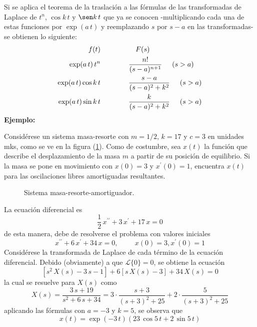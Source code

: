 Si se aplica el teorema de la traslación a las fórmulas de las transformadas de Laplace de $t^{n}$, $\cos k \, t$ y $\sen k \, t$ que ya se conocen  -multiplicando cada una de estas funciones por $\exp(a \, t)$ y reemplazando $s$ por $s - a$ en las transformadas- se obtienen lo siguiente:
\begin{align}
f(t) & \quad \quad \quad \quad \quad F(s) \nonumber \\
\exp(a \, t) \, t^{n} & \quad \quad \quad \quad \dfrac{n!}{(s-a)^{n+1}} \hspace{0.5cm} (s > a)  \label{eq:ecuacion_07_03_06} \\
\exp(a \, t) \cos k \, t & \quad \quad \quad \quad \dfrac{s-a}{(s-a)^{2}+ k^{2}} \hspace{0.5cm} (s > a)  \label{eq:ecuacion_07_03_07}\\
\exp(a \, t) \sin k \, t & \quad \quad \quad \quad \dfrac{k}{(s-a)^{2} + k^{2}} \hspace{0.5cm} (s > a)  \label{eq:ecuacion_07_03_08}
\end{align}
\textbf{Ejemplo:}
\par
Considérese un sistema masa-resorte con $m = 1/2$, $k = 17$ y $c = 3$ en unidades mks, como se ve en la figura (\ref{fig:figura_008}). Como de costumbre, sea $x(t)$ la función que describe el desplazamiento de la masa $m$ a partir de su posición de equilibrio. Si la masa se pone en movimiento con $x(0)= 3$ y $x^{\prime}(0) = 1$, encuentra $x(t)$ para las oscilaciones libres amortiguadas resultantes.
\begin{figure}[H]
    \centering
    
    \caption{Sistema masa-resorte-amortiguador.}
    \label{fig:figura_008}
\end{figure}
La ecuación diferencial es
\[ \dfrac{1}{2} \, x^{\prime \prime} + 3 \, x^{\prime} + 17 \, x = 0 \]
de esta manera, debe de resolverse el problema con valores iniciales
\[ x^{\prime \prime} + 6 \, x^{\prime} + 34 \, x = 0, \hspace{1cm} x(0) = 3, x^{\prime}(0) = 1 \]
Considérese la transformada de Laplace de cada término de la ecuación diferencial. Debido (obviamente) a que $\mathscr{L} \{ 0 \} = 0 $, se obtiene la ecuación
\[ [s^{2} \, X(s) - 3 \, s - 1] + 6 [s \, X(s) - 3] +  34 \, X(s) = 0 \]
la cual se resuelve para $X(s)$ como 
\[ X(s) = \dfrac{3 \, s + 19}{s^{2} + 6 \, s + 34} =  3 \cdot \dfrac{s + 3}{(s+3)^{2} + 25} + 2 \cdot \dfrac{5}{(s+3)^{2} + 25} \]
aplicando las fórmulas con $a=-3$ y $k=5$, se observa que
\[ x(t) = \exp(-3 \, t) (23 \, \cos 5 \, t  + 2 \, \sin 5 \, t) \]
